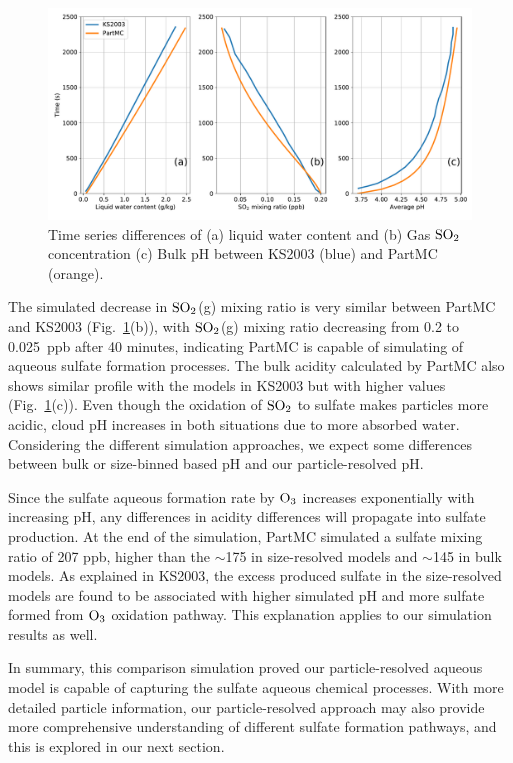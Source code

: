 \documentclass[edeposit,fullpage]{uiucthesis2009}
\newcommand{\jcedits}[1]{{\color{blue} #1}}
\begin{document}
\begin{figure}[ht]
    \centering \includegraphics[scale=0.5]{chap2_figs/chap2_fig1_profile.pdf}
    \caption{\jcedits{Time series} differences of (a) liquid water content
      and (b) Gas $\rm SO_2$ concentration (c) Bulk pH between KS2003 (blue)
      and PartMC (orange).}
    \label{chap2:ks2003}
\end{figure}

The simulated decrease in $\rm SO_2$(g) mixing ratio is very similar
between PartMC and KS2003 (Fig.~\ref{chap2:ks2003}(b)), with $\rm
SO_2$(g) mixing ratio decreasing from 0.2 to 0.025~ppb after 40
minutes, indicating PartMC is capable of simulating of aqueous sulfate
formation processes. The bulk acidity calculated by PartMC also shows
similar profile with the models in KS2003 but with higher values
(Fig.~\ref{chap2:ks2003}(c)). \jcedits{Even though the oxidation of $\rm SO_2$ to sulfate makes particles more acidic, cloud pH increases in both situations due to more absorbed water.} Considering the different simulation
approaches, we expect some differences between bulk or size-binned
based pH and our particle-resolved pH.

Since the sulfate aqueous formation rate by $\rm O_3$ increases
exponentially with increasing pH, any differences in acidity
differences will propagate into sulfate production. At the end of the
simulation, PartMC simulated a sulfate mixing ratio of 207 ppb, higher
than the $\sim$175 in size-resolved models and $\sim$145 in bulk
models. As explained in KS2003, the excess produced sulfate in the
size-resolved models are found to be associated with higher simulated
pH and more sulfate formed from $\rm O_3$ oxidation pathway. This
explanation applies to our simulation results as well.

In summary, this comparison simulation proved our particle-resolved
aqueous model is capable of capturing the sulfate aqueous chemical
processes.  With more detailed particle information, our
particle-resolved approach may also provide more comprehensive
understanding of different sulfate formation pathways, and this is
explored in our next section.
\end{document}
